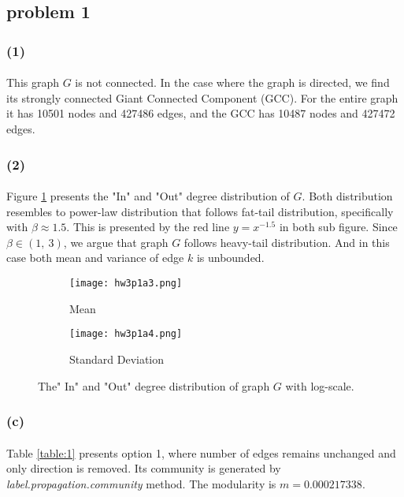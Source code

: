 \subsection*{problem 1}
\subsubsection*{(1)}
\paragraph{}
This graph $G$ is not connected. In the case where the graph is directed, we find its strongly connected Giant Connected Component (GCC). For the entire graph it has 10501 nodes and 427486 edges, and the GCC has 10487 nodes and 427472 edges.
\subsubsection*{(2)}
\paragraph{}
Figure \ref{fig:a1} presents the "In" and "Out" degree distribution of $G$. Both distribution resembles to power-law distribution that follows fat-tail distribution, specifically with $\beta \approx 1.5$. This is presented by the red line $y = x^{-1.5}$ in both sub figure. Since $\beta \in (1,\ 3)$, we argue that graph $G$ follows heavy-tail distribution. And in this case both mean and variance of edge $k$ is unbounded.  
\vspace{-12pt}
\begin{figure}[h]
	\centering
	\begin{subfigure}{.5\textwidth}
		\centering
		\texttt{[image: hw3p1a3.png]}
		\caption{Mean}	
	\end{subfigure}%
	\begin{subfigure}{.5\textwidth}
		\centering
		\texttt{[image: hw3p1a4.png]}
		\caption{Standard Deviation}
	\end{subfigure}
	\caption{The" In" and "Out" degree distribution of graph $G$ with log-scale.}
	\label{fig:a1}
\end{figure}

\subsubsection*{(c)}
\paragraph{}
Table \ref{table:1} presents option 1, where number of edges remains unchanged and only direction is removed. Its community is generated by \textit{label.propagation.community} method. The modularity is $m = 0.000217338$.
